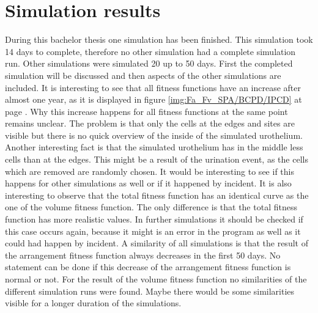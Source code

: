 \section{Simulation results}\label{sec:SimulationResults}
During this bachelor thesis one simulation has been finished. This simulation took 14 days to complete, therefore no other simulation had a complete simulation run. Other simulations were simulated 20 up to 50 days. First the completed simulation will be discussed and then aspects of the other simulations are included. \newline
It is interesting to see that all fitness functions have an increase after almost one year, as it is displayed in figure \ref{img:Fa_Fv_SPA/BCPD/IPCD} at page \pageref{img:Fa_Fv_SPA/BCPD/IPCD}. Why this increase happens for all fitness functions at the same point remains unclear. The problem is that only the cells at the edges and sites are visible but there is no quick overview of the inside of the simulated urothelium. Another interesting fact is that the simulated urothelium has in the middle less cells than at the edges. This might be a result of the urination event, as the cells which are removed are randomly chosen. It would be interesting to see if this happens for other simulations as well or if it happened by incident. It is also interesting to observe that the total fitness function has an identical curve as the one of the volume fitness function. The only difference is that the total fitness function has more realistic values. In further simulations it should be checked if this case occurs again, because it might is an error in the program as well as it could had happen by incident.\newline
A similarity of all simulations is that the result of the arrangement fitness function always decreases in the first 50 days. No statement can be done if this decrease of the arrangement fitness function is normal or not. For the result of the volume fitness function no similarities of the different simulation runs were found. Maybe there would be some similarities visible for a longer duration of the simulations.


